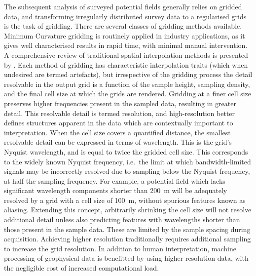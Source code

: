 The subsequent analysis of surveyed potential fields generally relies on gridded data, and transforming irregularly distributed survey data to a regularised grids is the task of gridding.
There are several classes of gridding methods available.
Minimum Curvature gridding \parencite{briggsMachineContouringUsing1974} is routinely applied in industry applications, as it gives well characterised results in rapid time, with minimal manual intervention.
A comprehensive review of traditional spatial interpolation methods is presented by \textcite{liReviewComparativeStudies2011}.
Each method of gridding has characteristic interpolation traits (which when undesired are termed artefacts), but irrespective of the gridding process the detail resolvable in the output grid is a function of the sample height, sampling density, and the final cell size at which the grids are rendered.
Gridding at a finer cell size preserves higher frequencies present in the sampled data, resulting in greater detail.
This resolvable detail is termed resolution, and high-resolution better defines structures apparent in the data which are contextually important to interpretation.
When the cell size covers a quantified distance, the smallest resolvable detail can be expressed in terms of wavelength.
This is the grid's Nyquist wavelength, and is equal to twice the gridded cell size.
This corresponds to the widely known Nyquist frequency, i.e.\ the limit at which bandwidth-limited signals may be incorrectly resolved due to sampling below the Nyquist frequency, at half the sampling frequency.
For example, a potential field which lacks significant wavelength components shorter than \qty{200}{\m} will be adequately resolved by a grid with a cell size of \qty{100}{\m}, without spurious features known as aliasing.
Extending this concept, arbitrarily shrinking the cell size will not resolve additional detail unless also predicting features with wavelengths shorter than those present in the sample data.
These are limited by the sample spacing during acquisition.
Achieving higher resolution traditionally requires additional sampling to increase the grid resolution. %
In addition to human interpretation, machine processing of geophysical data is benefitted by using higher resolution data, with the negligible cost of increased computational load.

